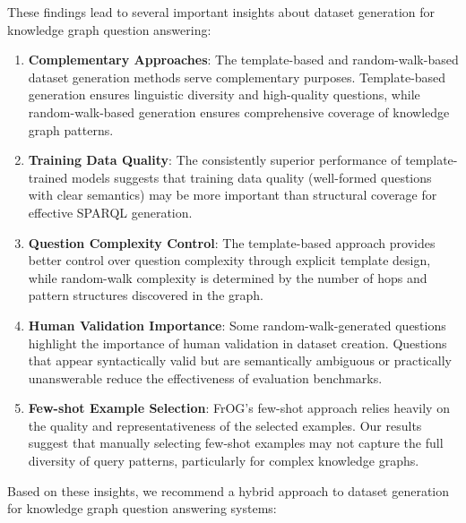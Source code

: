 These findings lead to several important insights about dataset generation for knowledge graph question answering:

\begin{enumerate}
    \item \textbf{Complementary Approaches}: The template-based and random-walk-based dataset generation methods serve complementary purposes. Template-based generation ensures linguistic diversity and high-quality questions, while random-walk-based generation ensures comprehensive coverage of knowledge graph patterns.
    
    \item \textbf{Training Data Quality}: The consistently superior performance of template-trained models suggests that training data quality (well-formed questions with clear semantics) may be more important than structural coverage for effective SPARQL generation.
    
    \item \textbf{Question Complexity Control}: The template-based approach provides better control over question complexity through explicit template design, while random-walk complexity is determined by the number of hops and pattern structures discovered in the graph.
    
    \item \textbf{Human Validation Importance}: Some random-walk-generated questions highlight the importance of human validation in dataset creation. Questions that appear syntactically valid but are semantically ambiguous or practically unanswerable reduce the effectiveness of evaluation benchmarks.
    
    \item \textbf{Few-shot Example Selection}: FrOG's few-shot approach relies heavily on the quality and representativeness of the selected examples. Our results suggest that manually selecting few-shot examples may not capture the full diversity of query patterns, particularly for complex knowledge graphs.
\end{enumerate}

Based on these insights, we recommend a hybrid approach to dataset generation for knowledge graph question answering systems:

